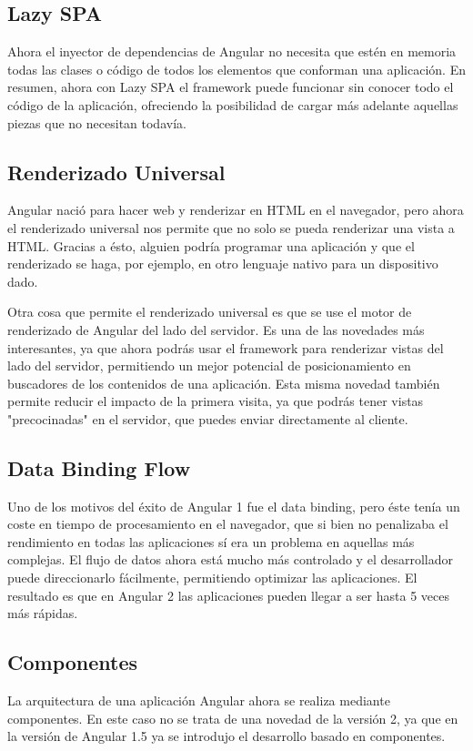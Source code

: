 \documentclass[12pt,twoside]{book}
\begin{document}
 \subsection{Lazy SPA} 
Ahora el inyector de dependencias de Angular no necesita que estén en memoria todas las clases o código de todos los elementos que conforman una aplicación. En resumen, ahora con Lazy SPA el framework puede funcionar sin conocer todo el código de la aplicación, ofreciendo la posibilidad de cargar más adelante aquellas piezas que no necesitan todavía.

\subsection{Renderizado Universal} 
Angular nació para hacer web y renderizar en HTML en el navegador, pero ahora el renderizado universal nos permite que no solo se pueda renderizar una vista a HTML. Gracias a ésto, alguien podría programar una aplicación y que el renderizado se haga, por ejemplo, en otro lenguaje nativo para un dispositivo dado.

Otra cosa que permite el renderizado universal es que se use el motor de renderizado de Angular del lado del servidor. Es una de las novedades más interesantes, ya que ahora podrás usar el framework para renderizar vistas del lado del servidor, permitiendo un mejor potencial de posicionamiento en buscadores de los contenidos de una aplicación. Esta misma novedad también permite reducir el impacto de la primera visita, ya que podrás tener vistas "precocinadas" en el servidor, que puedes enviar directamente al cliente.

\subsection{Data Binding Flow}
Uno de los motivos del éxito de Angular 1 fue el data binding, pero éste tenía un coste en tiempo de procesamiento en el navegador, que si bien no penalizaba el rendimiento en todas las aplicaciones sí era un problema en aquellas más complejas. El flujo de datos ahora está mucho más controlado y el desarrollador puede direccionarlo fácilmente, permitiendo optimizar las aplicaciones. El resultado es que en Angular 2 las aplicaciones pueden llegar a ser hasta 5 veces más rápidas.

\subsection{Componentes}
La arquitectura de una aplicación Angular ahora se realiza mediante componentes. En este caso no se trata de una novedad de la versión 2, ya que en la versión de Angular 1.5 ya se introdujo el desarrollo basado en componentes.
\end{document}
